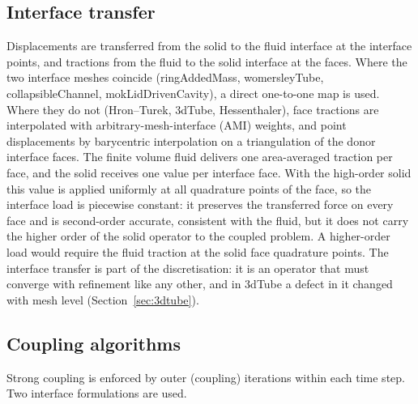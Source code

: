 \subsection{Interface transfer}\label{sec:interface_transfer}

Displacements are transferred from the solid to the fluid interface at the interface points, and tractions from the fluid to the solid interface at the faces.
Where the two interface meshes coincide (ringAddedMass, womersleyTube, collapsibleChannel, mokLidDrivenCavity), a direct one-to-one map is used.
Where they do not (Hron--Turek, 3dTube, Hessenthaler), face tractions are interpolated with arbitrary-mesh-interface (AMI) weights, and point displacements by barycentric interpolation on a triangulation of the donor interface faces.
The finite volume fluid delivers one area-averaged traction per face, and the solid receives one value per interface face.
With the high-order solid this value is applied uniformly at all quadrature points of the face, so the interface load is piecewise constant: it preserves the transferred force on every face and is second-order accurate, consistent with the fluid, but it does not carry the higher order of the solid operator to the coupled problem.
A higher-order load would require the fluid traction at the solid face quadrature points.
The interface transfer is part of the discretisation: it is an operator that must converge with refinement like any other, and in 3dTube a defect in it changed with mesh level (Section~\ref{sec:3dtube}).

\subsection{Coupling algorithms}\label{sec:coupling_algorithms}

Strong coupling is enforced by outer (coupling) iterations within each time step.
Two interface formulations are used.

